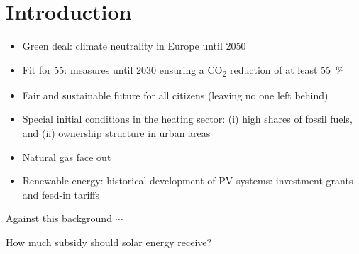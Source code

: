 \section{Introduction}
\begin{itemize}
	\item Green deal: climate neutrality in Europe until 2050
	\item Fit for 55: measures until 2030 ensuring a CO\textsubscript{2} reduction of at least \SI{55}{\%} 
	\item Fair and sustainable future for all citizens (leaving no one left behind)
	\item Special initial conditions in the heating sector: (i) high shares of fossil fuels, and (ii) ownership structure in urban areas
	\item Natural gas face out
\end{itemize}

\vspace{0.5cm}

\begin{itemize}
	\item Renewable energy: historical development of PV systems: investment grants and feed-in tariffs
\end{itemize}

Against this background $\cdots$

How much subsidy should solar energy receive? \cite{bezdek1982much}


